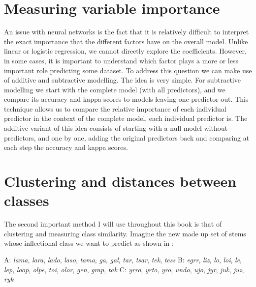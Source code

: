 \section{Measuring variable importance}


An issue with neural networks is the fact that it is relatively difficult to interpret the exact importance that the different factors have on the overall model. Unlike linear or logistic regression, we cannot directly explore the coefficients. However, in some cases, it is important to understand which factor plays a more or less important role predicting some dataset. To address this question we can make use of additive and subtractive modelling. The idea is very simple. For subtractive modelling we start with the complete model (with all predictors), and we compare its accuracy and kappa scores to models leaving one predictor out. This technique allows us to compare the relative importance of each individual predictor in the context of the complete model, each individual predictor is. The additive variant of this idea consists of starting with a null model without predictors, and one by one, adding the original predictors back and comparing at each step the accuracy and kappa scores.

\section{Clustering and distances between classes}


The second important method I will use throughout this book is that of clustering and measuring class similarity. Imagine the new made up set of stems whose inflectional class we want to predict as shown in :

\begin{exe}
    \ex \label{inf-class-2}
    \begin{xlist}
        \ex A: \textit{lama}, \textit{lara}, \textit{lado}, \textit{laso}, \textit{tama}, \textit{ga}, \textit{gal}, \textit{tar}, \textit{tsar}, \textit{tek}, \textit{tess}
        \ex B: \textit{egrr}, \textit{liz}, \textit{lo}, \textit{loi}, \textit{le}, \textit{lep}, \textit{loop}, \textit{olpe}, \textit{toi}, \textit{olor}, \textit{gen}, \textit{grap}, \textit{tak}
        \ex C: \textit{yrro}, \textit{yrto}, \textit{yro}, \textit{undo}, \textit{ujo}, \textit{jyr}, \textit{juk}, \textit{juz}, \textit{ryk}
    \end{xlist}
\end{exe}

